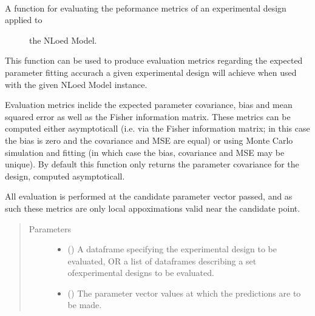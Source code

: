 \documentclass[letterpaper,10pt,english,openany,oneside]{sphinxmanual}
\begin{document}
\begin{fulllineitems}
\begin{fulllineitems}
\label{\detokenize{nloed:nloed.model.Model.evaluate}}~\begin{description}
\item[{A function for evaluating the peformance metrics of an experimental design applied to}] \leavevmode
the NLoed Model.

\end{description}

This function can be used to produce evaluation metrics regarding the expected parameter
fitting accurach a given experimental design will achieve when used with the given NLoed
Model instance.

Evaluation metrics inclide the expected parameter covariance, bias and mean
squared error as well as the Fisher information matrix. These metrics can be computed either
asymptoticall (i.e. via the Fisher information matrix; in this case the bias is zero and the
covariance and MSE are equal) or using Monte Carlo simulation and fitting (in which case the
bias, covariance and MSE may be unique). By default this function only returns the parameter
covariance for the design, computed asymptoticall.

All evaluation is performed at the candidate parameter vector passed, and as such these
metrics are only local appoximations valid near the candidate point.
\begin{quote}\begin{description}
\item[{Parameters}] \leavevmode\begin{itemize}
\item {} 
 () \textendash{} A dataframe specifying the experimental design
to be evaluated,
OR a list of dataframes describing a set ofexperimental designs to be evaluated.

\item {} 
 (\sphinxstyleliteralemphasis{\sphinxupquote{, }}) \textendash{} The parameter vector values at which the predictions are to be made.


\end{itemize}
\end{description}
\end{quote}
\end{fulllineitems}
\end{fulllineitems}
\end{document}
